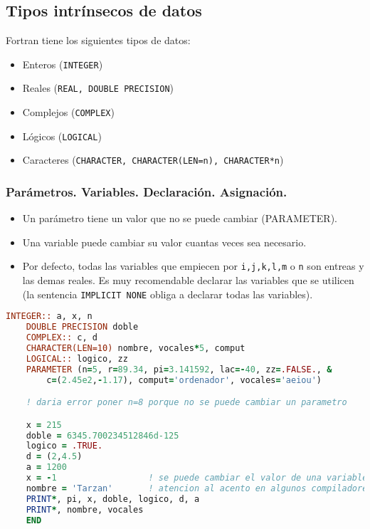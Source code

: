 \subsection{Tipos intrínsecos de datos}

Fortran tiene los siguientes tipos de datos:

\begin{itemize}
	\item Enteros ({\tt INTEGER})
	\item Reales ({\tt REAL, DOUBLE PRECISION})
	\item Complejos ({\tt COMPLEX})
	\item Lógicos ({\tt LOGICAL})
	\item Caracteres ({\tt CHARACTER, CHARACTER(LEN=n), CHARACTER*n})
\end{itemize}

\subsubsection{Parámetros. Variables. Declaración. Asignación.}

\begin{itemize}
	\item Un parámetro tiene un valor que no se puede cambiar (PARAMETER).
	\item Una variable puede cambiar su valor cuantas veces sea necesario.
	\item Por defecto, todas las variables que empiecen por \texttt{i,j,k,l,m} o \texttt{n} son entreas y las demas reales. Es muy recomendable declarar las variables que se utilicen (la sentencia {\tt IMPLICIT NONE} obliga a declarar todas las variables).
\end{itemize}

\begin{lstlisting}[language=Fortran]
	INTEGER:: a, x, n
	DOUBLE PRECISION doble
	COMPLEX:: c, d
	CHARACTER(LEN=10) nombre, vocales*5, comput
	LOGICAL:: logico, zz
	PARAMETER (n=5, r=89.34, pi=3.141592, lac=-40, zz=.FALSE., &
		c=(2.45e2,-1.17), comput='ordenador', vocales='aeiou')

	! daria error poner n=8 porque no se puede cambiar un parametro

	x = 215
	doble = 6345.700234512846d-125
	logico = .TRUE.
	d = (2,4.5)
	a = 1200
	x = -1  				! se puede cambiar el valor de una variable
	nombre = 'Tarzan' 		! atencion al acento en algunos compiladores
	PRINT*, pi, x, doble, logico, d, a
	PRINT*, nombre, vocales
	END
\end{lstlisting}

